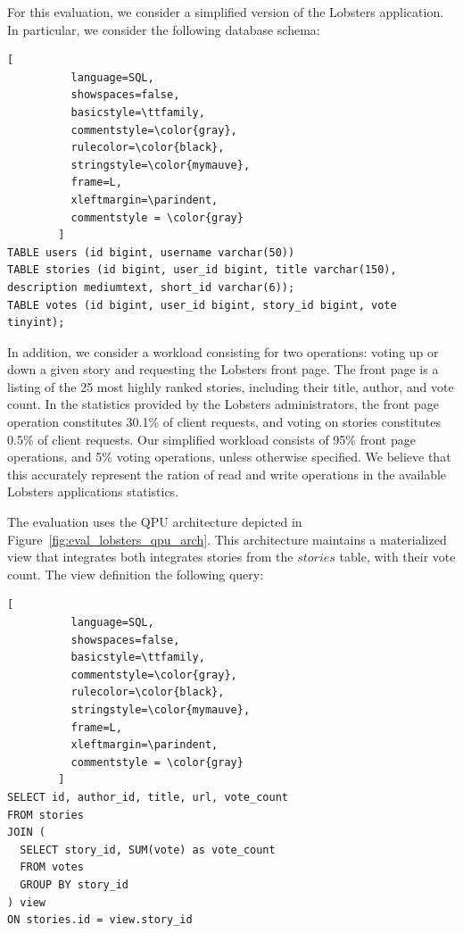 For this evaluation, we consider a simplified version of the Lobsters application.
In particular, we consider the following database schema:

\begin{lstlisting}[
          language=SQL,
          showspaces=false,
          basicstyle=\ttfamily,
          commentstyle=\color{gray},
          rulecolor=\color{black},
          stringstyle=\color{mymauve},
          frame=L,
          xleftmargin=\parindent,
          commentstyle = \color{gray}
        ]
TABLE users (id bigint, username varchar(50))
TABLE stories (id bigint, user_id bigint, title varchar(150), description mediumtext, short_id varchar(6));
TABLE votes (id bigint, user_id bigint, story_id bigint, vote tinyint);
\end{lstlisting}

In addition, we consider a workload consisting for two operations: voting up or down a given story and requesting the Lobsters
front page.
The front page is a listing of the 25 most highly ranked stories, including their title, author, and vote count.
In the statistics provided by the Lobsters administrators, the front page operation constitutes 30.1\% of client requests,
and voting on stories constitutes 0.5\% of client requests.
Our simplified workload consists of 95\% front page operations, and 5\% voting operations, unless otherwise specified.
We believe that this accurately represent the ration of read and write operations in the available Lobsters applications
statistics.


\bigskip
\noindent
The evaluation uses the QPU architecture depicted in Figure~\ref{fig:eval_lobsters_qpu_arch}.
This architecture maintains a materialized view that integrates both integrates stories from the $stories$ table,
with their vote count.
The view definition the following query:

\begin{lstlisting}[
          language=SQL,
          showspaces=false,
          basicstyle=\ttfamily,
          commentstyle=\color{gray},
          rulecolor=\color{black},
          stringstyle=\color{mymauve},
          frame=L,
          xleftmargin=\parindent,
          commentstyle = \color{gray}
        ]
SELECT id, author_id, title, url, vote_count
FROM stories
JOIN (
  SELECT story_id, SUM(vote) as vote_count
  FROM votes
  GROUP BY story_id
) view
ON stories.id = view.story_id
\end{lstlisting}

